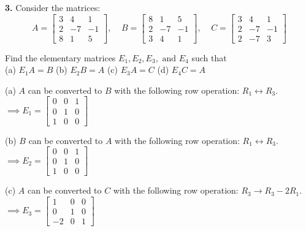 \documentclass[addpoints]{exam}
\begin{document}
\begin{questions}
\begin{solution}
    \end{solution}

    \textbf{3. } Consider the matrices: 
    $$ A = \begin{bmatrix}
        3 & 4 & 1 \\ 2 & -7 & -1 \\ 8 & 1 & 5
    \end{bmatrix}, \;\;\;\; B = \begin{bmatrix}
        8 & 1 & 5 \\ 2 & -7 & -1 \\ 3 & 4 & 1 
    \end{bmatrix}, \;\;\;\; C = \begin{bmatrix}
        3 & 4 & 1 \\ 2 & -7 & -1 \\ 2 & -7 & 3
    \end{bmatrix} $$

    Find the elementary matrices $ E_1, E_2, E_3, \text{ and } E_4 $ such that \\ 
    (a) $ E_1A = B $ \hspace{5mm} (b) $ E_2B = A $ \hspace{5mm} (c) $ E_3A = C $ \hspace{5mm} (d) $ E_4C = A $
    \begin{solution}
        
        (a) $A$ can be converted to $B$ with the following row operation: $ R_1 \longleftrightarrow R_3 $. \\ 
        $ \implies E_1 = \begin{bmatrix}
            0 & 0 & 1 \\ 0 & 1 & 0 \\ 1 & 0 & 0
        \end{bmatrix} $

        (b) $ B $ can be converted to $A$ with the following row operation: $ R_1 \longleftrightarrow R_3 $. \\ 
        $ \implies E_2 = \begin{bmatrix}
            0 & 0 & 1 \\ 0 & 1 & 0 \\ 1 & 0 & 0
        \end{bmatrix} $

        (c) $A$ can be converted to $C$ with the following row operation: $ R_3 \longrightarrow R_3 - 2R_1 $. \\
        $ \implies E_3 = \begin{bmatrix}
            1 & 0 & 0 \\ 0 & 1 & 0 \\ -2 & 0 & 1
        \end{bmatrix} $ 


\end{solution}
\end{questions}
\end{document}
